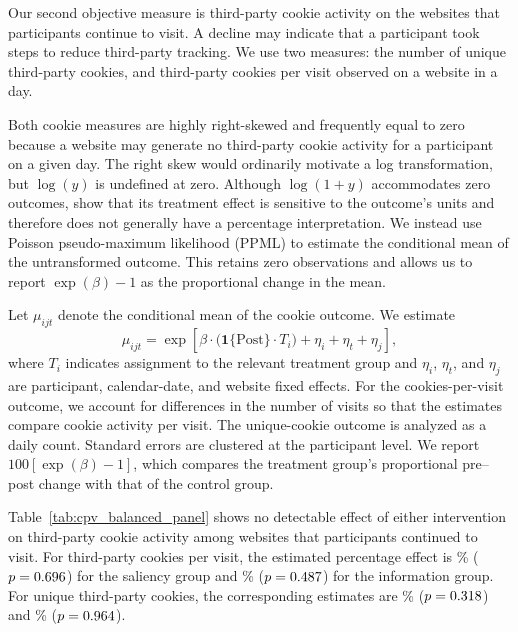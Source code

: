 \documentclass[12pt]{article}
\theoremstyle{definition}
\theoremstyle{remark}
\begin{document}
\begin{appendix}
Our second objective measure is third-party cookie activity on the websites that participants continue to visit. A decline may indicate that a participant took steps to reduce third-party tracking. We use two measures: the number of unique third-party cookies, and third-party cookies per visit observed on a website in a day.

Both cookie measures are highly right-skewed and frequently equal to zero because a website may generate no third-party cookie activity for a participant on a given day. The right skew would ordinarily motivate a log transformation, but $\log(y)$ is undefined at zero. Although $\log(1+y)$ accommodates zero outcomes, \citet{chen2024logs} show that its treatment effect is sensitive to the outcome’s units and therefore does not generally have a percentage interpretation. We instead use Poisson pseudo-maximum likelihood (PPML) to estimate the conditional mean of the untransformed outcome. This retains zero observations and allows us to report $\exp(\beta)-1$ as the proportional change in the mean.

Let $\mu_{ijt}$ denote the conditional mean of the cookie outcome. We estimate
\begin{equation}\label{eq:data_sharing_did}
\mu_{ijt}
=
\exp\left[
\beta \cdot \Big(\mathbf{1}\{\text{Post}\}\cdot T_i\Big)
+\eta_i+\eta_t+\eta_j
\right],
\end{equation}
where $T_i$ indicates assignment to the relevant treatment group and $\eta_i$, $\eta_t$, and $\eta_j$ are participant, calendar-date, and website fixed effects. For the cookies-per-visit outcome, we account for differences in the number of visits so that the estimates compare cookie activity per visit. The unique-cookie outcome is analyzed as a daily count. Standard errors are clustered at the participant level. We report $100[\exp(\beta)-1]$, which compares the treatment group's proportional pre--post change with that of the control group.

Table~\ref{tab:cpv_balanced_panel} shows no detectable effect of either intervention on third-party cookie activity among websites that participants continued to visit. For third-party cookies per visit, the estimated percentage effect is \cpvBalSalPct\% ($p = 0.696{}$) for the saliency group and \cpvBalInfoPct\% ($p = 0.487{}$) for the information group. For unique third-party cookies, the corresponding estimates are \cpvBalUcSalPct\% ($p = 0.318{}$) and \cpvBalUcInfoPct\% ($p = 0.964{}$).


\end{appendix}
\end{document}
